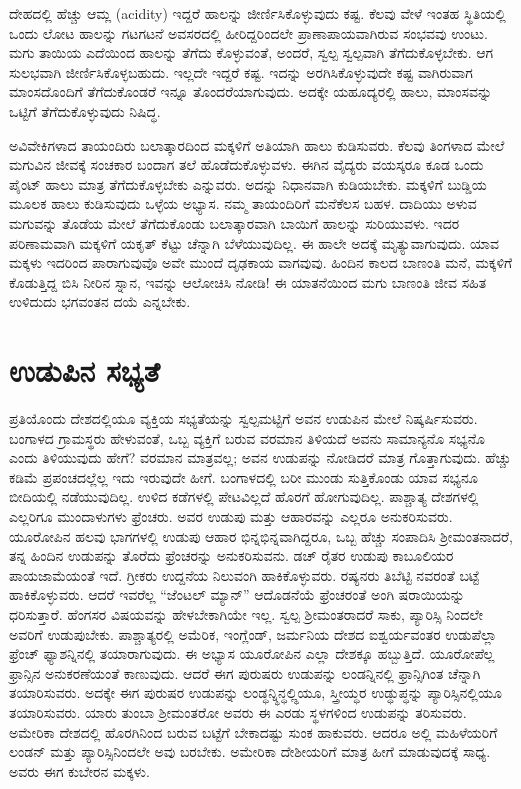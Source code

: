 ದೇಹದಲ್ಲಿ ಹೆಚ್ಚು ಆಮ್ಲ (acidity) ಇದ್ದರೆ ಹಾಲನ್ನು ಜೀರ್ಣಿಸಿಕೊಳ್ಳುವುದು ಕಷ್ಟ. ಕೆಲವು ವೇಳೆ ಇಂತಹ ಸ್ಥಿತಿಯಲ್ಲಿ ಒಂದು ಲೋಟ ಹಾಲನ್ನು ಗಟಗಟನೆ ಅವಸರದಲ್ಲಿ ಹೀರಿದ್ದರಿಂದಲೇ ಪ್ರಾಣಾಪಾಯವಾಗಿರುವ ಸಂಭವವು ಉಂಟು. ಮಗು ತಾಯಿಯ ಎದೆಯಿಂದ ಹಾಲನ್ನು ತೆಗೆದು ಕೊಳ್ಳುವಂತೆ, ಅಂದರೆ, ಸ್ವಲ್ಪ ಸ್ವಲ್ಪವಾಗಿ ತೆಗೆದುಕೊಳ್ಳಬೇಕು. ಆಗ ಸುಲಭವಾಗಿ ಜೀರ್ಣಿಸಿಕೊಳ್ಳಬಹುದು. ಇಲ್ಲದೇ ಇದ್ದರೆ ಕಷ್ಟ. ಇದನ್ನು ಅರಗಿಸಿಕೊಳ್ಳು\break ವುದೇ ಕಷ್ಟ ವಾಗಿರುವಾಗ ಮಾಂಸದೊಂದಿಗೆ ತೆಗೆದುಕೊಂಡರೆ ಇನ್ನೂ ತೊಂದರೆಯಾಗು\break ವುದು. ಅದಕ್ಕೇ ಯಹೂದ್ಯರಲ್ಲಿ ಹಾಲು, ಮಾಂಸವನ್ನು ಒಟ್ಟಿಗೆ ತೆಗೆದುಕೊಳ್ಳುವುದು ನಿಷಿದ್ಧ.

ಅವಿವೇಕಿಗಳಾದ ತಾಯಂದಿರು ಬಲಾತ್ಕಾರದಿಂದ ಮಕ್ಕಳಿಗೆ ಅತಿಯಾಗಿ ಹಾಲು ಕುಡಿಸುವರು. ಕೆಲವು ತಿಂಗಳಾದ ಮೇಲೆ ಮಗುವಿನ ಜೀವಕ್ಕೆ ಸಂಚಕಾರ ಬಂದಾಗ ತಲೆ ಹೊಡೆದುಕೊಳ್ಳುವಳು. ಈಗಿನ ವೈದ್ಯರು ವಯಸ್ಕರೂ ಕೂಡ ಒಂದು ಪೈಂಟ್​ ಹಾಲು ಮಾತ್ರ ತೆಗೆದುಕೊಳ್ಳಬೇಕು ಎನ್ನುವರು. ಅದನ್ನು ನಿಧಾನವಾಗಿ ಕುಡಿಯಬೇಕು. ಮಕ್ಕಳಿಗೆ ಬುಡ್ಡಿಯ ಮೂಲಕ ಹಾಲು ಕುಡಿಸುವುದು ಒಳ್ಳೆಯ ಅಭ್ಯಾಸ. ನಮ್ಮ ತಾಯಂದಿರಿಗೆ ಮನೆಕೆಲಸ ಬಹಳ. ದಾದಿಯು ಅಳುವ ಮಗುವನ್ನು ತೊಡೆಯ ಮೇಲೆ ತೆಗೆದುಕೊಂಡು ಬಲಾತ್ಕಾರವಾಗಿ ಬಾಯಿಗೆ ಹಾಲನ್ನು ಸುರಿಯುವಳು. ಇದರ ಪರಿಣಾಮವಾಗಿ ಮಕ್ಕಳಿಗೆ ಯಕೃತ್​ ಕೆಟ್ಟು ಚೆನ್ನಾಗಿ ಬೆಳೆಯುವುದಿಲ್ಲ. ಈ ಹಾಲೇ ಅದಕ್ಕೆ ಮೃತ್ಯುವಾಗುವುದು. ಯಾವ ಮಕ್ಕಳು ಇದರಿಂದ ಪಾರಾಗುವುವೊ ಅವೇ ಮುಂದೆ ದೃಢಕಾಯ ವಾಗವುವು. ಹಿಂದಿನ ಕಾಲದ ಬಾಣಂತಿ ಮನೆ, ಮಕ್ಕಳಿಗೆ ಕೊಡುತ್ತಿದ್ದ ಬಿಸಿ ನೀರಿನ ಸ್ನಾನ, ಇವನ್ನು ಆಲೋಚಿಸಿ ನೋಡಿ! ಈ ಯಾತನೆಯಿಂದ ಮಗು ಬಾಣಂತಿ ಜೀವ ಸಹಿತ ಉಳಿದುದು ಭಗವಂತನ ದಯೆ ಎನ್ನಬೇಕು.

\newpage

\section*{ಉಡುಪಿನ ಸಭ್ಯತೆ}

ಪ್ರತಿಯೊಂದು ದೇಶದಲ್ಲಿಯೂ ವ್ಯಕ್ತಿಯ ಸಭ್ಯತೆಯನ್ನು ಸ್ವಲ್ಪಮಟ್ಟಿಗೆ ಅವನ ಉಡುಪಿನ ಮೇಲೆ ನಿಷ್ಕರ್ಷಿಸುವರು. ಬಂಗಾಳದ ಗ್ರಾಮಸ್ಥರು ಹೇಳುವಂತೆ, ಒಬ್ಬ ವ್ಯಕ್ತಿಗೆ ಬರುವ ವರಮಾನ ತಿಳಿಯದೆ ಅವನು ಸಾಮಾನ್ಯನೊ ಸಭ್ಯನೊ ಎಂದು ತಿಳಿಯುವುದು ಹೇಗೆ? ವರಮಾನ ಮಾತ್ರವಲ್ಲ; ಅವನ ಉಡುಪನ್ನು ನೋಡಿದರೆ ಮಾತ್ರ ಗೊತ್ತಾಗುವುದು. ಹೆಚ್ಚು ಕಡಿಮೆ ಪ್ರಪಂಚದಲ್ಲೆಲ್ಲ ಇದು ಇರುವುದೇ ಹೀಗೆ. ಬಂಗಾಳದಲ್ಲಿ ಬರೀ ಮುಂಡು ಸುತ್ತಿಕೊಂಡು ಯಾವ ಸಭ್ಯನೂ ಬೀದಿಯಲ್ಲಿ ನಡೆಯುವುದಿಲ್ಲ. ಉಳಿದ ಕಡೆಗಳಲ್ಲಿ ಪೇಟವಿಲ್ಲದೆ ಹೊರಗೆ ಹೋಗುವುದಿಲ್ಲ. ಪಾಶ್ಚಾತ್ಯ ದೇಶಗಳಲ್ಲಿ ಎಲ್ಲರಿಗೂ ಮುಂದಾಳುಗಳು ಫ್ರೆಂಚರು. ಅವರ ಉಡುಪು ಮತ್ತು ಆಹಾರವನ್ನು ಎಲ್ಲರೂ ಅನುಕರಿಸುವರು. ಯೂರೋಪಿನ ಹಲವು ಭಾಗಗಳಲ್ಲಿ ಉಡುಪು ಆಹಾರ ಭಿನ್ನಭಿನ್ನವಾಗಿದ್ದರೂ, ಒಬ್ಬ ಹೆಚ್ಚು ಸಂಪಾದಿಸಿ ಶ‍್ರೀಮಂತನಾದರೆ, ತನ್ನ ಹಿಂದಿನ ಉಡುಪನ್ನು ತೊರೆದು ಫ್ರೆಂಚರನ್ನು ಅನುಕರಿಸುವನು. ಡಚ್​ ರೈತರ ಉಡುಪು ಕಾಬೂಲಿಯರ ಪಾಯಜಾಮೆಯಂತೆ ಇದೆ. ಗ್ರೀಕರು ಉದ್ದನೆಯ ನಿಲುವಂಗಿ ಹಾಕಿಕೊಳ್ಳುವರು. ರಷ್ಯನರು ತಿಬೆಟ್ಟಿ ನವರಂತೆ ಬಟ್ಟೆ ಹಾಕಿಕೊಳ್ಳುವರು. ಆದರೆ ಇವರೆಲ್ಲ “ಜೆಂಟಲ್​ ಮ್ಯಾನ್​” ಆದೊಡನೆಯೆ ಫ್ರೆಂಚರಂತೆ ಅಂಗಿ ಷರಾಯಿಯನ್ನು ಧರಿಸುತ್ತಾರೆ. ಹೆಂಗಸರ ವಿಷಯವನ್ನು ಹೇಳಬೇಕಾಗಿಯೇ ಇಲ್ಲ. ಸ್ವಲ್ಪ ಶ‍್ರೀಮಂತರಾದರೆ ಸಾಕು, ಪ್ಯಾರಿಸ್ಸಿ ನಿಂದಲೇ ಅವರಿಗೆ ಉಡುಪುಬೇಕು. ಪಾಶ್ಚಾತ್ಯರಲ್ಲಿ ಅಮೆರಿಕ, ಇಂಗ್ಲೆಂಡ್​, ಜರ್ಮನಿಯ ದೇಶದ ಐಶ್ವರ್ಯವಂತರ ಉಡುಪೆಲ್ಲಾ ಫ್ರೆಂಚ್​ ಫ್ಯಾಶನ್ನಿನಲ್ಲಿ ತಯಾರಾಗುವುದು. ಈ ಅಭ್ಯಾಸ ಯೂರೋಪಿನ ಎಲ್ಲಾ ದೇಶಕ್ಕೂ ಹಬ್ಬುತ್ತಿದೆ. ಯೂರೋಪೆಲ್ಲ ಫ್ರಾನ್ಸಿನ ಅನುಕರಣೆಯಂತೆ ಕಾಣುವುದು. ಆದರೆ ಈಗ ಪುರುಷರು ಉಡುಪನ್ನು ಲಂಡನ್ನಿನಲ್ಲಿ ಫ್ರಾನ್ಸಿಗಿಂತ ಚೆನ್ನಾಗಿ ತಯಾರಿಸುವರು. ಅದಕ್ಕೇ ಈಗ ಪುರುಷರ ಉಡುಪನ್ನು ಲಂಡ್ಧನ್ನ್ಧಿನ್ಧಲ್ಲ್ಧಿಯೂ, ಸ್ತ್ರೀಯ್ಧರ ಉಡ್ಧುಪ್ಧನ್ನು ಪ್ಯಾರಿಸ್ಸಿನಲ್ಲಿಯೂ ತಯಾರಿಸುವರು. ಯಾರು ತುಂಬಾ ಶ‍್ರೀಮಂತರೋ ಅವರು ಈ ಎರಡು ಸ್ಥಳಗಳಿಂದ ಉಡುಪನ್ನು ತರಿಸುವರು. ಅಮೇರಿಕಾ ದೇಶದಲ್ಲಿ ಹೊರಗಿನಿಂದ ಬರುವ ಬಟ್ಟೆಗೆ ಬೇಕಾದಷ್ಟು ಸುಂಕ ಹಾಕುವರು. ಆದರೂ ಅಲ್ಲಿ ಮಹಿಳೆಯರಿಗೆ ಲಂಡನ್​ ಮತ್ತು ಪ್ಯಾರಿಸ್ಸಿನಿಂದಲೇ ಅವು ಬರಬೇಕು. ಅಮೇರಿಕಾ ದೇಶೀಯರಿಗೆ ಮಾತ್ರ ಹೀಗೆ ಮಾಡುವುದಕ್ಕೆ ಸಾಧ್ಯ. ಅವರು ಈಗ ಕುಬೇರನ ಮಕ್ಕಳು.

